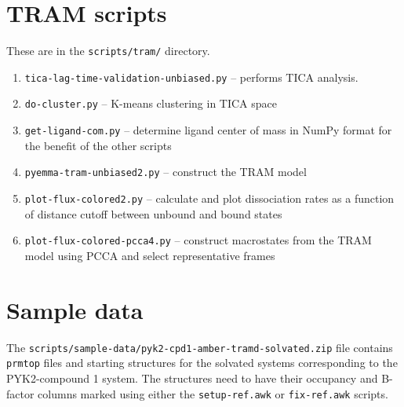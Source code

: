 \documentclass{article}      %
\begin{document}
\section{TRAM scripts}

These are in the \verb+scripts/tram/+ directory.
\begin{enumerate} 
\item \verb+tica-lag-time-validation-unbiased.py+ -- performs TICA analysis. \\
\item \verb+do-cluster.py+ -- K-means clustering in TICA space \\
\item \verb+get-ligand-com.py+ -- determine ligand center of mass in NumPy format for the benefit of the other scripts \\
\item \verb+pyemma-tram-unbiased2.py+ -- construct the TRAM model \\
\item \verb+plot-flux-colored2.py+ -- calculate  and plot dissociation rates as a function of distance cutoff between unbound and bound states \\
\item \verb+plot-flux-colored-pcca4.py+ -- construct macrostates from the TRAM model using PCCA and select representative frames
\end{enumerate}

\section{Sample data}

The \verb+scripts/sample-data/pyk2-cpd1-amber-tramd-solvated.zip+ file contains \verb+prmtop+ files and starting structures for the solvated systems corresponding to the PYK2-compound 1 system.  The structures need to have their occupancy and B-factor columns marked using either the \verb+setup-ref.awk+ or \verb+fix-ref.awk+ scripts.
\end{document}
